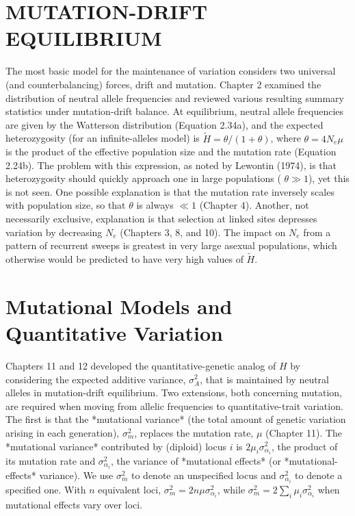 \documentclass{article}
\begin{document}
\section{MUTATION-DRIFT EQUILIBRIUM}
The most basic model for the maintenance of variation considers two universal (and counterbalancing) forces, drift and mutation. Chapter 2 examined the distribution of neutral allele frequencies and reviewed various resulting summary statistics under mutation-drift balance. At equilibrium, neutral allele frequencies are given by the Watterson distribution (Equation 2.34a), and the expected heterozygosity (for an infinite-alleles model) is  $ \widetilde{H} = \theta/(1 + \theta) $, where  $ \theta = 4N_e\mu $ is the product of the effective population size and the mutation rate (Equation 2.24b). The problem with this expression, as noted by Lewontin (1974), is that heterozygosity should quickly approach one in large populations ( $ \theta \gg 1 $), yet this is not seen. One possible explanation is that the mutation rate inversely scales with population size, so that  $ \theta $ is always  $ \ll 1 $ (Chapter 4). Another, not necessarily exclusive, explanation is that selection at linked sites depresses variation by decreasing  $ N_e $ (Chapters 3, 8, and 10). The impact on  $ N_e $ from a pattern of recurrent sweeps is greatest in very large asexual populations, which otherwise would be predicted to have very high values of  $ \widetilde{H} $.

\section{Mutational Models and Quantitative Variation}
Chapters 11 and 12 developed the quantitative-genetic analog of $H$ by considering the expected additive variance, $\sigma_A^2$, that is maintained by neutral alleles in mutation-drift equilibrium. Two extensions, both concerning mutation, are required when moving from allelic frequencies to quantitative-trait variation. The first is that the *mutational variance* (the total amount of genetic variation arising in each generation), $\sigma_m^2$, replaces the mutation rate, $\mu$ (Chapter 11). The *mutational variance* contributed by (diploid) locus $i$ is $2\mu_i\sigma_{\alpha_i}^2$, the product of its mutation rate and $\sigma_{\alpha_i}^2$, the variance of *mutational effects* (or *mutational-effects* variance). We use $\sigma_m^2$ to denote an unspecified locus and $\sigma_{\alpha_i}^2$ to denote a specified one. With $n$ equivalent loci, $\sigma_m^2 = 2n\mu\sigma_{\alpha_i}^2$, while $\sigma_m^2 = 2\sum_i\mu_i\sigma_{\alpha_i}^2$ when mutational effects vary over loci.
\end{document}
